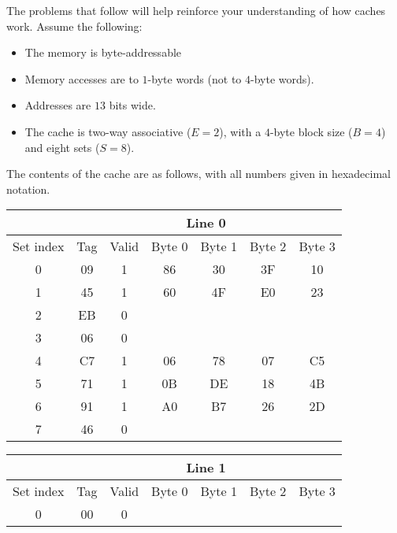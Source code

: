 \documentclass[12pt]{article}
\newenvironment{ex}[2][Exercise]{\begin{trivlist}
		\item[\hskip \labelsep {\bfseries #1}\hskip \labelsep {\bfseries #2.}]}{\end{trivlist}}
\begin{document}
\begin{ex}{6.12}
	The problems that follow will help reinforce your understanding of how caches work. Assume
	the following:
	\begin{itemize}
		\item The memory is byte-addressable
		\item Memory accesses are to $1$-byte words (not to $4$-byte words).
		\item Addresses are $13$ bits wide.
		\item The cache is two-way associative ($E=2$), with a $4$-byte block size ($B=4$)
		and eight sets ($S=8$).
	\end{itemize}
	The contents of the cache are as follows, with all numbers given in hexadecimal notation.
	\begin{center}
		\begin{tabular}{c|cccccc}
			{} & \multicolumn{6}{c}{Line 0}\\
			\hline
			Set index & Tag & Valid & Byte 0 & Byte 1 & Byte 2 & Byte 3\\
			\hline
			0         & 09  & 1     & 86     & 30     & 3F     & 10\\
			
			1         & 45  & 1     & 60     & 4F     & E0     & 23\\
			
			2         & EB  & 0     & \makebox[0.5cm]{\hrulefill} & \makebox[0.5cm]{\hrulefill} & \makebox[0.5cm]{\hrulefill} & \makebox[0.5cm]{\hrulefill}\\
			
			3         & 06  & 0     & \makebox[0.5cm]{\hrulefill} & \makebox[0.5cm]{\hrulefill}     & \makebox[0.5cm]{\hrulefill} & \makebox[0.5cm]{\hrulefill}\\
			4         & C7  & 1     & 06     & 78     & 07     & C5\\
			5         & 71  & 1     & 0B     & DE     & 18     & 4B\\
			6         & 91  & 1     & A0     & B7     & 26     & 2D\\
			7         & 46  & 0     & \makebox[0.5cm]{\hrulefill} & \makebox[0.5cm]{\hrulefill} & \makebox[0.5cm]{\hrulefill} & \makebox[0.5cm]{\hrulefill}\\
		\end{tabular}
		\begin{tabular}{c|cccccc}
			{} & \multicolumn{6}{c}{Line 1}\\
			\hline
			Set index & Tag & Valid & Byte 0 & Byte 1 & Byte 2 & Byte 3\\
			\hline
			0         & 00  & 0     & \makebox[0.5cm]{\hrulefill}& \makebox[0.5cm]{\hrulefill} & \makebox[0.5cm]{\hrulefill} & \makebox[0.5cm]{\hrulefill}\\
			

\end{tabular}
\end{center}
\end{ex}
\end{document}
